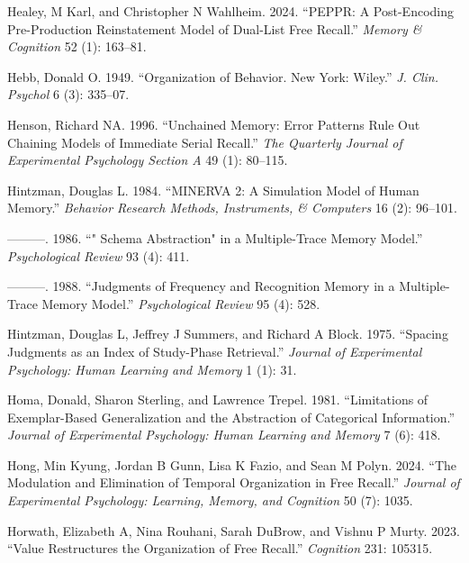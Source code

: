 \documentclass[
  letterpaper,
  11pt,
  english,
  singlespacing,
  headsepline]{MastersDoctoralThesis}
\newlength{\cslhangindent}
\newenvironment{CSLReferences}[2] %
 {\begin{list}{}{%
  \setlength{\itemindent}{0pt}
  \setlength{\leftmargin}{0pt}
  \setlength{\parsep}{0pt}
  \ifodd #1
   \setlength{\leftmargin}{\cslhangindent}
   \setlength{\itemindent}{-1\cslhangindent}
  \fi
  \setlength{\itemsep}{#2\baselineskip}}}
 {\end{list}}
\begin{document}
\begin{CSLReferences}{1}{0}
Healey, M Karl, and Christopher N Wahlheim. 2024. {``PEPPR: A
Post-Encoding Pre-Production Reinstatement Model of Dual-List Free
Recall.''} \emph{Memory \& Cognition} 52 (1): 163--81.

Hebb, Donald O. 1949. {``Organization of Behavior. New York: Wiley.''}
\emph{J. Clin. Psychol} 6 (3): 335--07.

Henson, Richard NA. 1996. {``Unchained Memory: Error Patterns Rule Out
Chaining Models of Immediate Serial Recall.''} \emph{The Quarterly
Journal of Experimental Psychology Section A} 49 (1): 80--115.

Hintzman, Douglas L. 1984. {``MINERVA 2: A Simulation Model of Human
Memory.''} \emph{Behavior Research Methods, Instruments, \& Computers}
16 (2): 96--101.

---------. 1986. {``" Schema Abstraction" in a Multiple-Trace Memory
Model.''} \emph{Psychological Review} 93 (4): 411.

---------. 1988. {``Judgments of Frequency and Recognition Memory in a
Multiple-Trace Memory Model.''} \emph{Psychological Review} 95 (4): 528.

Hintzman, Douglas L, Jeffrey J Summers, and Richard A Block. 1975.
{``Spacing Judgments as an Index of Study-Phase Retrieval.''}
\emph{Journal of Experimental Psychology: Human Learning and Memory} 1
(1): 31.

Homa, Donald, Sharon Sterling, and Lawrence Trepel. 1981. {``Limitations
of Exemplar-Based Generalization and the Abstraction of Categorical
Information.''} \emph{Journal of Experimental Psychology: Human Learning
and Memory} 7 (6): 418.

Hong, Min Kyung, Jordan B Gunn, Lisa K Fazio, and Sean M Polyn. 2024.
{``The Modulation and Elimination of Temporal Organization in Free
Recall.''} \emph{Journal of Experimental Psychology: Learning, Memory,
and Cognition} 50 (7): 1035.

Horwath, Elizabeth A, Nina Rouhani, Sarah DuBrow, and Vishnu P Murty.
2023. {``Value Restructures the Organization of Free Recall.''}
\emph{Cognition} 231: 105315.


\end{CSLReferences}
\end{document}
